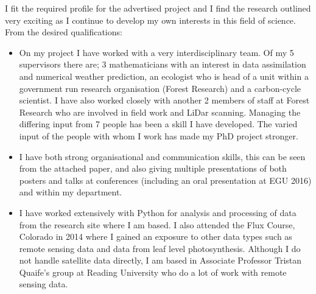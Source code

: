 \documentclass[11pt]{article}
\begin{document}
I fit the required profile for the advertised project and I find the research outlined very exciting as I continue to develop my own interests in this field of science. From the desired qualifications:
\begin{itemize}
\item On my project I have worked with a very interdisciplinary team. Of my 5 supervisors there are; 3 mathematicians with an interest in data assimilation and numerical weather prediction, an ecologist who is head of a unit within a government run research organisation (Forest Research) and a carbon-cycle scientist. I have also worked closely with another 2 members of staff at Forest Research who are involved in field work and LiDar scanning. Managing the differing input from 7 people has been a skill I have developed. The varied input of the people with whom I work has made my PhD project stronger.
\item I have both strong organisational and communication skills, this can be seen from the attached paper, and also giving multiple presentations of both posters and talks at conferences (including an oral presentation at EGU 2016) and within my department. 
\item I have worked extensively with Python for analysis and processing of data from the research site where I am based. I also attended the Flux Course, Colorado in 2014 where I gained an exposure to other data types such as remote sensing data and data from leaf level photosynthesis. Although I do not handle satellite data directly, I am based in Associate Professor Tristan Quaife's group at Reading University who do a lot of work with remote sensing data. 
\end{itemize}

\thispagestyle{empty}
{}
\end{document}
